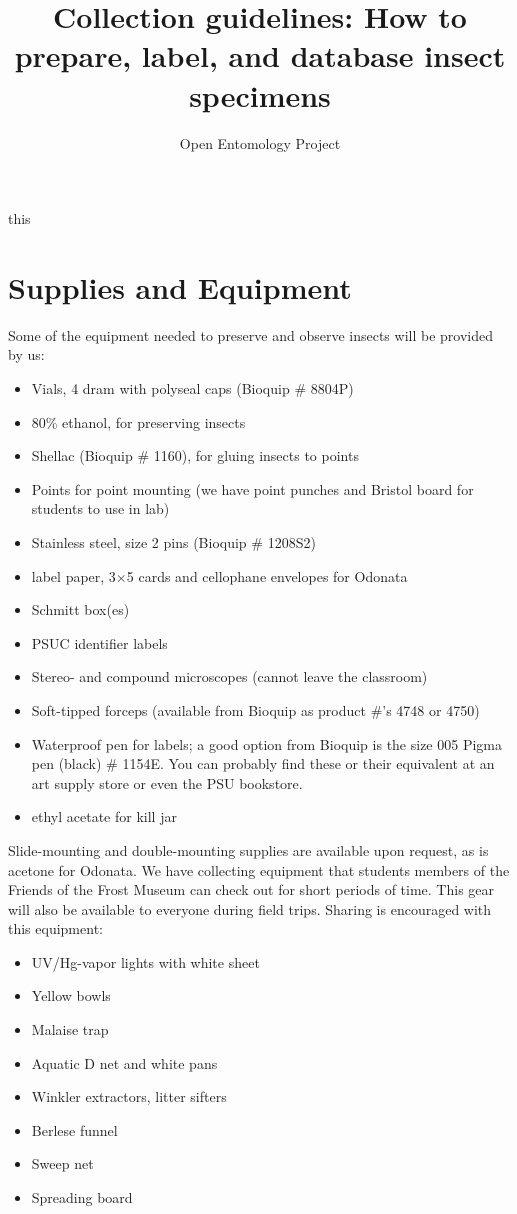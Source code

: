 \documentclass[letterpaper, 11pt]{article}
\title{Collection guidelines: How to prepare, label, and database insect specimens}
\author{Open Entomology Project}
\begin{document}
\cleanlookdateon %
\maketitle
\thispagestyle{fancy}

this \citep{USDAmanual}

\section{Supplies and Equipment}
Some of the equipment needed to preserve and observe insects will be provided by us:

\begin{itemize}
\item Vials, 4 dram with polyseal caps (Bioquip \# 8804P)
\item 80\% ethanol, for preserving insects
\item Shellac (Bioquip \# 1160), for gluing insects to points
\item Points for point mounting (we have point punches and Bristol board for students to use in lab)
\item Stainless steel, size 2 pins (Bioquip \# 1208S2)
\item label paper, 3$\times$5 cards and cellophane envelopes for Odonata
\item Schmitt box(es)
\item PSUC identifier labels
\item Stereo- and compound microscopes (cannot leave the classroom)
\item Soft-tipped forceps (available from Bioquip as product \#'s 4748 or 4750)
\item Waterproof pen for labels; a good option from Bioquip is the size 005 Pigma pen (black) \# 1154E. You can probably find these or their equivalent at an art supply store or even the PSU bookstore.
\item ethyl acetate for kill jar
\end{itemize}

Slide-mounting and double-mounting supplies are available upon request, as is acetone for Odonata. We have collecting equipment that students members of the Friends of the Frost Museum can check out for short periods of time. This gear will also be available to everyone during field trips. Sharing is encouraged with this equipment:

\begin{itemize}
\item UV/Hg-vapor lights with white sheet
\item Yellow bowls
\item Malaise trap
\item Aquatic D net and white pans
\item Winkler extractors, litter sifters
\item Berlese funnel
\item Sweep net
\item Spreading board
\end{itemize}
\end{document}
